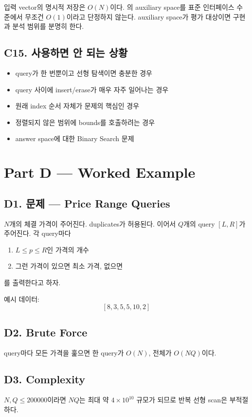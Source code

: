 입력 vector의 명시적 저장은 $O(N)$이다. 의 auxiliary space를 표준 인터페이스 수준에서 무조건 $O(1)$이라고 단정하지 않는다. auxiliary space가 평가 대상이면 구현과 분석 범위를 분명히 한다.

\subsection{C15. 사용하면 안 되는 상황}
\begin{itemize}
\item query가 한 번뿐이고 선형 탐색이면 충분한 경우
\item query 사이에 insert/erase가 매우 자주 일어나는 경우
\item 원래 index 순서 자체가 문제의 핵심인 경우
\item 정렬되지 않은 범위에 bounds를 호출하려는 경우
\item answer space에 대한 Binary Search 문제
\end{itemize}

\section{Part D --- Worked Example}

\subsection{D1. 문제 --- Price Range Queries}
$N$개의 체결 가격이 주어진다. duplicates가 허용된다. 이어서 $Q$개의 query $[L,R]$가 주어진다. 각 query마다
\begin{enumerate}
\item $L\le p\le R$인 가격의 개수
\item 그런 가격이 있으면 최소 가격, 없으면 
\end{enumerate}
를 출력한다고 하자.

예시 데이터:
\[
[8,3,5,5,10,2]
\]

\subsection{D2. Brute Force}
query마다 모든 가격을 훑으면 한 query가 $O(N)$, 전체가 $O(NQ)$이다.

\subsection{D3. Complexity}
$N,Q\le200000$이라면 $NQ$는 최대 약 $4\times10^{10}$ 규모가 되므로 반복 선형 scan은 부적절하다.

